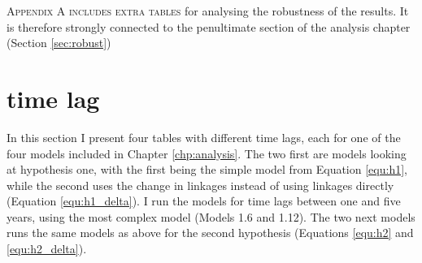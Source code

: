 \lettrine{A}{ppendix A includes extra tables} for analysing the robustness of the results. It is therefore strongly connected to the penultimate section of the analysis chapter (Section \ref{sec:robust})

\section{time lag}
In this section I present four tables with different time lags, each for one of the four models included in Chapter \ref{chp:analysis}. The two first are models looking at hypothesis one, with the first being the simple model from Equation \ref{equ:h1}, while the second uses the change in linkages instead of using linkages directly (Equation \ref{equ:h1_delta}). I run the models for time lags between one and five years, using the most complex model (Models 1.6 and 1.12). The two next models runs the same models as above for the second hypothesis (Equations \ref{equ:h2} and \ref{equ:h2_delta}). 

